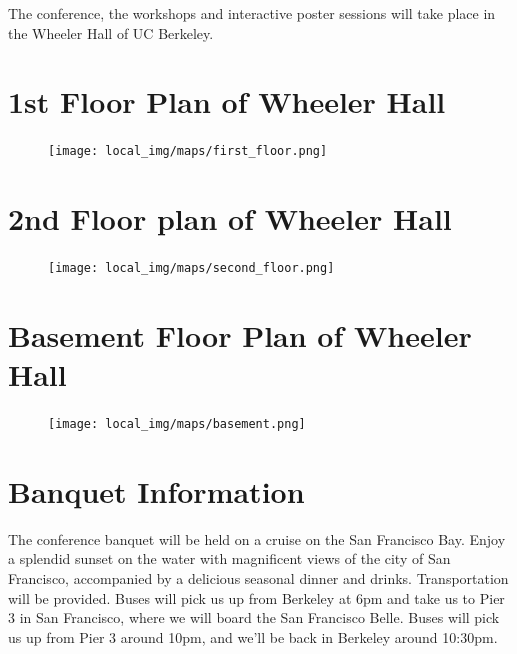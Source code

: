 The conference, the workshops and interactive poster sessions will take place in the Wheeler Hall of UC Berkeley. 

\newpage
{} \section{1st Floor Plan of Wheeler Hall}
\begin{figure}[h!]
\center
\texttt{[image: local\_img/maps/first\_floor.png]}
\end{figure}

\newpage
{} \section{2nd Floor plan of Wheeler Hall}

\begin{figure}[h!]
\center
\texttt{[image: local\_img/maps/second\_floor.png]}
\end{figure}

\newpage
{} \section{Basement Floor Plan of Wheeler Hall}
\begin{figure}[h!]
\center
\texttt{[image: local\_img/maps/basement.png]}
\end{figure}



 \section{Banquet Information}
The conference banquet will be held on a cruise on the San Francisco Bay. Enjoy a splendid sunset on the water with magnificent views of the city of San Francisco, accompanied by a delicious seasonal dinner and drinks. Transportation will be provided. Buses will pick us up from Berkeley at 6pm and take us to Pier 3 in San Francisco, where we will board the San Francisco Belle.  Buses will pick us up from Pier 3 around 10pm, and we'll be back in Berkeley around 10:30pm.








\setlength\fboxrule{0pt}

